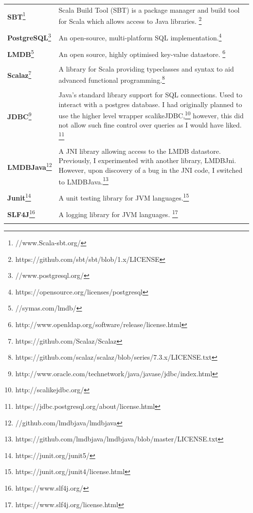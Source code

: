 \documentclass[12pt,a4paper,twoside,openright]{report}
\begin{document}
\begin{tabular}{p{4cm}p{11cm}}
\textbf{SBT}\footnote{//www.Scala-sbt.org/} & Scala Build Tool (SBT) is a package manager and build tool for Scala which allows access to Java libraries. \footnote{https://github.com/sbt/sbt/blob/1.x/LICENSE}\\
\\
\textbf{PostgreSQL}\footnote{//www.postgresql.org/} & An open-source, multi-platform SQL implementation.\footnote{https://opensource.org/licenses/postgresql}\\\\

\textbf{LMDB}\footnote{//symas.com/lmdb/}&An open source, highly optimised key-value datastore. \footnote{http://www.openldap.org/software/release/license.html}\\\\

\textbf{Scalaz}\footnote{https://github.com/Scalaz/Scalaz} & A library for Scala providing typeclasses and syntax to aid advanced functional programming.\footnote{https://github.com/scalaz/scalaz/blob/series/7.3.x/LICENSE.txt} \\\\

\textbf{JDBC}\footnote{http://www.oracle.com/technetwork/java/javase/jdbc/index.html} & Java's standard library support for SQL connections. Used to interact with a postgres database. I had originally planned to use the higher level wrapper scalikeJDBC,\footnote{http://scalikejdbc.org/} however, this did not allow such fine control over queries as I would have liked. \footnote{https://jdbc.postgresql.org/about/license.html}\\\\

\textbf{LMDBJava}\footnote{//github.com/lmdbjava/lmdbjava} & A JNI library allowing access to the LMDB datastore. Previously, I experimented with another library, LMDBJni. However, upon discovery of a bug in the JNI code, I switched to LMDBJava.\footnote{https://github.com/lmdbjava/lmdbjava/blob/master/LICENSE.txt}\\\\

\textbf{Junit}\footnote{https://junit.org/junit5/} & A unit testing library for JVM languages.\footnote{https://junit.org/junit4/license.html}\\\\

\textbf{SLF4J}\footnote{https://www.slf4j.org/} & A logging library for JVM languages. \footnote{https://www.slf4j.org/license.html} \\\\


\end{tabular}
\end{document}
